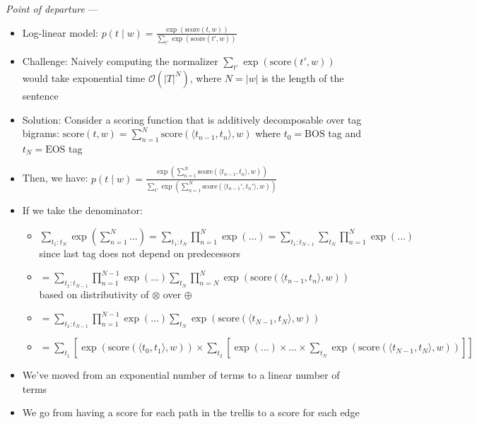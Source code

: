 \emph{Point of departure} --- 
\begin{itemize}
    \item Log-linear model:
    $
    p(t \mid w) = \frac{\exp(\textrm{score}(t, w))}{\sum_{t'} \exp(\textrm{score}(t', w))}
    $
    \item Challenge: Naively computing the normalizer $\sum_{t'} \exp(\textrm{score}(t', w))$ would take exponential time $\mathcal{O}(|T|^N)$, where $N = |w|$ is the length of the sentence
    \item Solution: Consider a scoring function that is additively decomposable over tag bigrams:
    $
    \textrm{score}(t, w) = \sum_{n=1}^N \textrm{score}(\langle t_{n-1}, t_n \rangle, w)
    $
    where $t_0 = \textrm{BOS}$ tag and $t_{N} = \textrm{EOS}$ tag
    \item Then, we have:
    $
    p(t \mid w) = \frac{\exp\left( \sum_{n=1}^N \textrm{score}(\langle t_{n-1}, t_n \rangle, w) \right)}{\sum_{t'} \exp\left( \sum_{n=1}^N \textrm{score}(\langle t_{n-1}', t_n' \rangle, w) \right)}
    $
    \item If we take the denominator:
    \begin{itemize}
        \item $
        \sum_{t_1:t_N} \exp\left( \sum_{n=1}^N \dots \right) = \sum_{t_1:t_N} \prod_{n=1}^N \exp(\dots) = \sum_{t_1:t_{N-1}} \sum_{t_N} \prod_{n=1}^N \exp(\dots)
        $ since last tag does not depend on predecessors
        \item $ = \sum_{t_1:t_{N-1}} \prod_{n=1}^{N-1} \exp(\dots) \sum_{t_N} \prod_{n=N}^{N} \exp\left(\textrm{score}(\langle t_{n-1}, t_n \rangle, w) \right) 
        $ based on distributivity of $\otimes$ over $\oplus$
        \item $ = \sum_{t_1:t_{N-1}} \prod_{n=1}^{N-1} \exp(\dots) \sum_{t_N} \exp\left(\textrm{score}(\langle t_{N-1}, t_N \rangle, w) \right) 
        $
        \item $ = \sum_{t_1} [ \exp\left(\textrm{score}(\langle t_0, t_1 \rangle, w) \right) \times \sum_{t_2} [ \exp(\dots) \times \dots \times \sum_{t_N} \exp\left(\textrm{score}(\langle t_{N-1}, t_N \rangle, w) \right)]]
        $
    \end{itemize}
    \item We've moved from an exponential number of terms to a linear number of terms
    \item We go from having a score for each path in the trellis to a score for each edge
\end{itemize}

